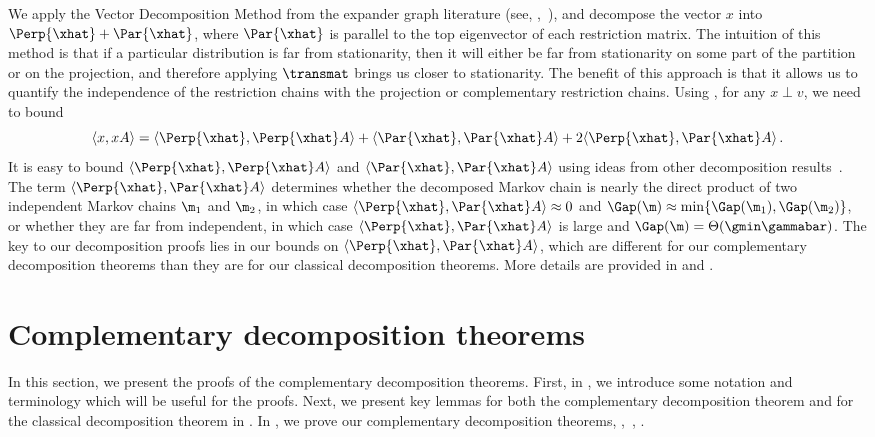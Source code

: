 We apply the Vector Decomposition Method from the expander graph 
literature (see, \eg,~\cite{RVW, expander-book}), and decompose the 
vector $x$ into $\Perp{\xhat}+\Par{\xhat}$, where $\Par{\xhat}$ is 
parallel to the top eigenvector of each restriction matrix.  The 
intuition of this method is that if a particular distribution is far 
from stationarity, then it will either be far from stationarity on some 
part of the partition or on the projection, and therefore applying 
$\transmat$ brings us closer to stationarity. The benefit of this 
approach is that it allows us to quantify the independence of the 
restriction chains with the projection or complementary restriction chains.
Using 
, for any $x\perp v$, we need to bound 
\begin{equation}\label{eq:split}
\langle x, xA\rangle = \langle \Perp{\xhat},\Perp{\xhat}A\rangle + 
\langle\Par{\xhat},\Par{\xhat}A\rangle + 2\langle \Perp{\xhat},\Par{\xhat}A\rangle\,.
\end{equation}
It is easy to bound $\langle \Perp{\xhat},\Perp{\xhat}A\rangle$ and 
$\langle\Par{\xhat},\Par{\xhat}A\rangle$ using ideas from other 
decomposition results~\cite{jstv04, MR00}. The term $\langle 
\Perp{\xhat},\Par{\xhat}A\rangle$ determines whether the decomposed 
Markov chain is nearly the direct product of two independent Markov 
chains $\m_1$ and $\m_2$, in which case $\langle 
\Perp{\xhat},\Par{\xhat}A\rangle\approx0$ and $\Gap(\m)\approx 
\min\{\Gap(\m_1),\Gap(\m_2)\}$, or whether they are far from 
independent, in which case $\langle \Perp{\xhat},\Par{\xhat}A\rangle$ 
is large and $\Gap(\m)=\Theta(\gmin \gammabar)$.  The key to our 
decomposition proofs lies in our bounds on $\langle 
\Perp{\xhat},\Par{\xhat}A\rangle$, which are different for our 
complementary decomposition theorems than they are for our classical 
decomposition theorems.   More details are provided in  and .

\section{Complementary decomposition theorems}\label{sec:decompProofs} 


In this section, we present the proofs of the complementary 
decomposition theorems.  First, in , we 
introduce some notation and terminology which will be useful for the 
proofs.  Next, we present key lemmas for both the complementary 
decomposition theorem and for the classical decomposition theorem in 
. In , we prove our 
complementary decomposition theorems, 
,~, 
.  

